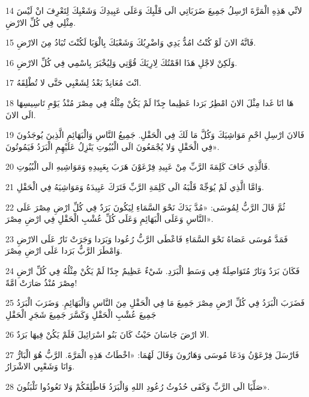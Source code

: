 \par 14 لانِّي هَذِهِ الْمَرَّةَ ارْسِلُ جَمِيعَ ضَرَبَاتِي الَى قَلْبِكَ وَعَلَى عَبِيدِكَ وَشَعْبِكَ لِتَعْرِفَ انْ لَيْسَ مِثْلِي فِي كُلِّ الارْضِ.
\par 15 فَانَّهُ الانَ لَوْ كُنْتُ امُدُّ يَدِي وَاضْرِبُكَ وَشَعْبَكَ بِالْوَبَا لَكُنْتَ تُبَادُ مِنَ الارْضِ.
\par 16 وَلَكِنْ لاجْلِ هَذَا اقَمْتُكَ لِارِيَكَ قُوَّتِي وَلِيُخْبَرَ بِاسْمِي فِي كُلِّ الارْضِ.
\par 17 انْتَ مُعَانِدٌ بَعْدُ لِشَعْبِي حَتَّى لا تُطْلِقَهُ.
\par 18 هَا انَا غَدا مِثْلَ الانَ امْطِرُ بَرَدا عَظِيما جِدّا لَمْ يَكُنْ مِثْلُهُ فِي مِصْرَ مُنْذُ يَوْمِ تَاسِيسِهَا الَى الانَ.
\par 19 فَالانَ ارْسِلِ احْمِ مَوَاشِيَكَ وَكُلَّ مَا لَكَ فِي الْحَقْلِ. جَمِيعُ النَّاسِ وَالْبَهَائِمِ الَّذِينَ يُوجَدُونَ فِي الْحَقْلِ وَلا يُجْمَعُونَ الَى الْبُيُوتِ يَنْزِلُ عَلَيْهِمِ الْبَرَدُ فَيَمُوتُونَ».
\par 20 فَالَّذِي خَافَ كَلِمَةَ الرَّبِّ مِنْ عَبِيدِ فِرْعَوْنَ هَرَبَ بِعَبِيدِهِ وَمَوَاشِيهِ الَى الْبُيُوتِ.
\par 21 وَامَّا الَّذِي لَمْ يُوَجِّهْ قَلْبَهُ الَى كَلِمَةِ الرَّبِّ فَتَرَكَ عَبِيدَهُ وَمَوَاشِيَهُ فِي الْحَقْلِ.
\par 22 ثُمَّ قَالَ الرَّبُّ لِمُوسَى: «مُدَّ يَدَكَ نَحْوَ السَّمَاءِ لِيَكُونَ بَرَدٌ فِي كُلِّ ارْضِ مِصْرَ عَلَى النَّاسِ وَعَلَى الْبَهَائِمِ وَعَلَى كُلِّ عُشْبِ الْحَقْلِ فِي ارْضِ مِصْرَ».
\par 23 فَمَدَّ مُوسَى عَصَاهُ نَحْوَ السَّمَاءِ فَاعْطَى الرَّبُّ رُعُودا وَبَرَدا وَجَرَتْ نَارٌ عَلَى الارْضِ وَامْطَرَ الرَّبُّ بَرَدا عَلَى ارْضِ مِصْرَ.
\par 24 فَكَانَ بَرَدٌ وَنَارٌ مُتَوَاصِلَةٌ فِي وَسَطِ الْبَرَدِ. شَيْءٌ عَظِيمٌ جِدّا لَمْ يَكُنْ مِثْلُهُ فِي كُلِّ ارْضِ مِصْرَ مُنْذُ صَارَتْ امَّةً!
\par 25 فَضَرَبَ الْبَرَدُ فِي كُلِّ ارْضِ مِصْرَ جَمِيعَ مَا فِي الْحَقْلِ مِنَ النَّاسِ وَالْبَهَائِمِ. وَضَرَبَ الْبَرَدُ جَمِيعَ عُشْبِ الْحَقْلِ وَكَسَّرَ جَمِيعَ شَجَرِ الْحَقْلِ
\par 26 الا ارْضَ جَاسَانَ حَيْثُ كَانَ بَنُو اسْرَائِيلَ فَلَمْ يَكُنْ فِيهَا بَرَدٌ.
\par 27 فَارْسَلَ فِرْعَوْنُ وَدَعَا مُوسَى وَهَارُونَ وَقَالَ لَهُمَا: «اخْطَاتُ هَذِهِ الْمَرَّةَ. الرَّبُّ هُوَ الْبَارُّ وَانَا وَشَعْبِي الاشْرَارُ.
\par 28 صَلِّيَا الَى الرَّبِّ وَكَفَى حُدُوثُ رُعُودِ اللهِ وَالْبَرَدُ فَاطْلِقَكُمْ وَلا تَعُودُوا تَلْبَثُونَ».
